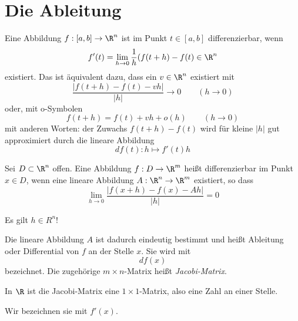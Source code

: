 \documentclass[a4paper,10pt]{scrbook}
\begin{document}
\section{Die Ableitung}

Eine Abbildung $f:[a,b]\to\R^n$ ist im Punkt $t\in[a,b]$ differenzierbar, wenn
\[
f'(t)=\lim_{h\to 0}\frac 1h (f(t+h)-f(t) \in \R^n
\]
existiert.
Das ist äquivalent dazu, dass ein $v\in\R^n$ existiert mit
\[
\frac{|f(t+h)-f(t)-vh|}{|h|}\to 0 \qquad (h\to 0)
\]
oder, mit o-Symbolen
\[
f(t+h)=f(t)+vh+o(h) \qquad (h\to 0)
\]
mit anderen Worten: der Zuwachs $f(t+h)-f(t)$ wird für kleine $|h|$ gut approximiert durch die lineare Abbildung
\[
df(t): h\mapsto f'(t)h
\]

\begin{df}
Sei $D\subset \R^n$ offen.
Eine Abbildung $f:D\to \R^m$ heißt differenzierbar im Punkt $x\in D$, wenn eine lineare Abbildung $A:\R^n\to\R^m$ existiert, so dass 
\[
\boxed{\lim_{h\to 0}\frac {|f(x+h)-f(x)-Ah|}{|h|}=0}
\]
\begin{note}
Es gilt $h\in R^n$!
\end{note}
Die lineare Abbildung $A$ ist dadurch eindeutig bestimmt und heißt Ableitung oder Differential von $f$ an der Stelle $x$.
Sie wird mit
\[
df(x)
\]
bezeichnet.
Die zugehörige $m\times n$-Matrix heißt \emph{Jacobi-Matrix}.
\begin{note}
In $\R$ ist die Jacobi-Matrix eine $1\times 1$-Matrix, also eine Zahl an einer Stelle.
\end{note}


Wir bezeichnen sie mit $f'(x)$.
\end{df}
\end{document}
